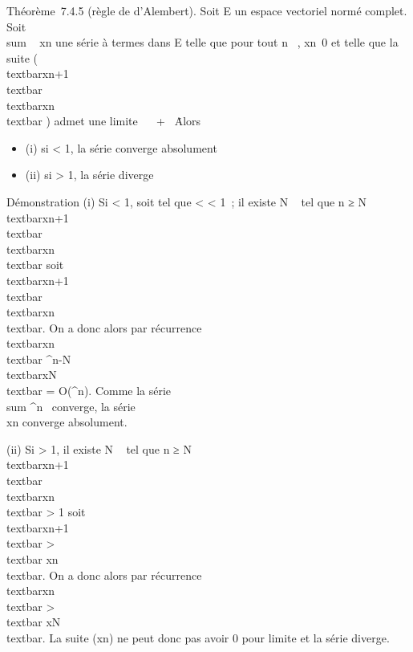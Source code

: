 Théorème~7.4.5 (règle de d'Alembert). Soit E un espace vectoriel normé
complet. Soit \\sum ~
xn une série à termes dans E telle que pour tout n \in {}~,
xn\neq~0 et telle que la suite (
\\textbar{}xn+1\\textbar{}
\over
\\textbar{}xn\\textbar{} )
admet une limite \ell \in {}~ \cup\ + \infty~\. Alors

\begin{itemize}
\itemsep1pt\parskip0pt
\item
  (i) si \ell \textless{} 1, la série converge absolument
\item
  (ii) si \ell \textgreater{} 1, la série diverge
\end{itemize}

Démonstration (i) Si \ell \textless{} 1, soit \rho tel que \ell \textless{} \rho
\textless{} 1~; il existe N \in {}~ tel que n ≥ N \rigtharrow~
\\textbar{}xn+1\\textbar{}
\over
\\textbar{}xn\\textbar{} \leq \rho
soit \\textbar{}xn+1\\textbar{}
\leq \rho\\textbar{}xn\\textbar{}. On
a donc alors par récurrence
\\textbar{}xn\\textbar{} \leq
\rho^n-N\\textbar{}xN\\textbar{}
= O(\rho^n). Comme la série
\\sum  \rho^n~
converge, la série \\\sum
 xn converge absolument.

(ii) Si \ell \textgreater{} 1, il existe N \in {}~ tel que n ≥ N \rigtharrow~
\\textbar{}xn+1\\textbar{}
\over
\\textbar{}xn\\textbar{}
\textgreater{} 1 soit
\\textbar{}xn+1\\textbar{}
\textgreater{}\\textbar{}
xn\\textbar{}. On a donc alors par récurrence
\\textbar{}xn\\textbar{}
\textgreater{}\\textbar{}
xN\\textbar{}. La suite (xn) ne peut
donc pas avoir 0 pour limite et la série diverge.

